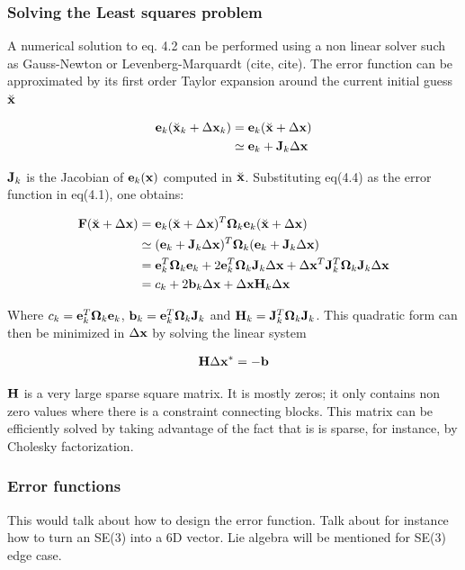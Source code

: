 \subsubsection{Solving the Least squares problem}

A numerical solution to eq. 4.2 can be performed using a non linear solver such as Gauss-Newton or Levenberg-Marquardt (cite, cite).  The error function can be approximated by its first order Taylor expansion around the current initial guess $\breve{\mathbf x}$

\begin{align}
  \mathbf e_k(\breve{\mathbf x}_k + \Delta \mathbf x_k) &= \mathbf e_k(\breve{\mathbf x} + \Delta \mathbf x) \\
      & \simeq \mathbf e_k + \mathbf J_k \Delta \mathbf x
\end{align}

$\mathbf J_k$ is the Jacobian of $\mathbf e_k(\mathbf x)$ computed in $\breve{\mathbf x}$.  Substituting eq(4.4) as the error function in eq(4.1), one obtains:

\begin{align}
  \mathbf F(\breve{\mathbf x} + \Delta \mathbf x) &= \mathbf e_k(\breve{\mathbf x} + \Delta \mathbf x)^T \mathbf \Omega_k \mathbf e_k(\breve{\mathbf x} + \Delta \mathbf x) \\
  & \simeq (\mathbf e_k + \mathbf J_k \Delta \mathbf x)^T 
    \mathbf \Omega_k 
    (\mathbf e_k + \mathbf J_k \Delta \mathbf x) \\
  &= \mathbf e_k^T \mathbf \Omega_k \mathbf e_k 
    + 2 \mathbf e_k^T \mathbf \Omega_k \mathbf J_k \Delta \mathbf x 
    + \Delta \mathbf x^T \mathbf J_k^T \mathbf \Omega_k \mathbf J_k \Delta \mathbf x \\
  &= c_k + 2\mathbf b_k \Delta \mathbf x + \Delta \mathbf x \mathbf H_k \Delta \mathbf x
\end{align}

Where $c_k = \mathbf e_k^T \mathbf \Omega_k \mathbf e_k$, $\mathbf b_k = \mathbf e_k^T \mathbf \Omega_k \mathbf J_k$ and $\mathbf H_k = \mathbf J_k^T \mathbf \Omega_k \mathbf J_k$. This quadratic form can then be minimized in $\Delta \mathbf x$ by solving the linear system

\begin{align}
   \mathbf H \Delta \mathbf x^* = -\mathbf b
\end{align}

$\mathbf H$ is a very large sparse square matrix.  It is mostly zeros; it only contains non zero values where there is a constraint connecting blocks.  This matrix can be efficiently solved by taking advantage of the fact that is is sparse, for instance, by Cholesky factorization.

\subsubsection{Error functions}
This would talk about how to design the error function.  Talk about for instance how to turn an SE(3) into a 6D vector.  Lie algebra will be mentioned for SE(3) edge case. 

